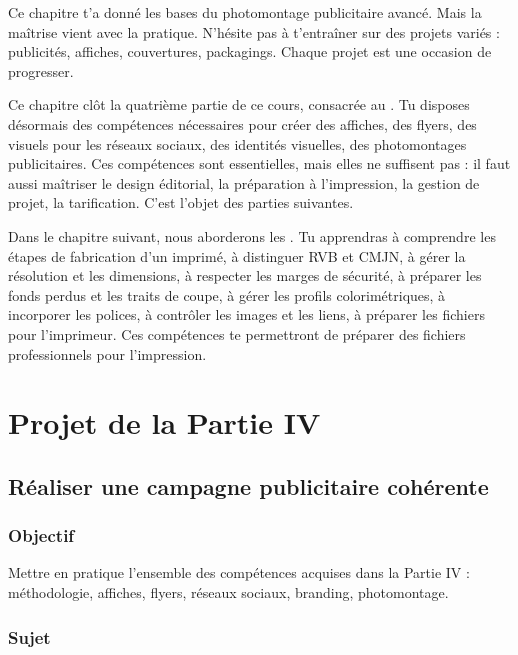 Ce chapitre t'a donné les bases du photomontage publicitaire avancé. Mais la maîtrise vient avec la pratique. N'hésite pas à t'entraîner sur des projets variés : publicités, affiches, couvertures, packagings. Chaque projet est une occasion de progresser.

Ce chapitre clôt la quatrième partie de ce cours, consacrée au . Tu disposes désormais des compétences nécessaires pour créer des affiches, des flyers, des visuels pour les réseaux sociaux, des identités visuelles, des photomontages publicitaires. Ces compétences sont essentielles, mais elles ne suffisent pas : il faut aussi maîtriser le design éditorial, la préparation à l'impression, la gestion de projet, la tarification. C'est l'objet des parties suivantes.

Dans le chapitre suivant, nous aborderons les . Tu apprendras à comprendre les étapes de fabrication d'un imprimé, à distinguer RVB et CMJN, à gérer la résolution et les dimensions, à respecter les marges de sécurité, à préparer les fonds perdus et les traits de coupe, à gérer les profils colorimétriques, à incorporer les polices, à contrôler les images et les liens, à préparer les fichiers pour l'imprimeur. Ces compétences te permettront de préparer des fichiers professionnels pour l'impression.

\section*{Projet de la Partie IV}

\subsection*{Réaliser une campagne publicitaire cohérente}

\subsubsection*{Objectif}

Mettre en pratique l'ensemble des compétences acquises dans la Partie IV : méthodologie, affiches, flyers, réseaux sociaux, branding, photomontage.

\subsubsection*{Sujet}

